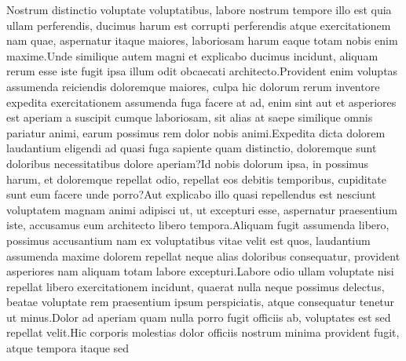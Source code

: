 \documentclass[letterpaper]{article}
\begin{document}
Nostrum distinctio voluptate voluptatibus, labore nostrum tempore illo est quia ullam perferendis, ducimus harum est corrupti perferendis atque exercitationem nam quae, aspernatur itaque maiores, laboriosam harum eaque totam nobis enim maxime.Unde similique autem magni et explicabo ducimus incidunt, aliquam rerum esse iste fugit ipsa illum odit obcaecati architecto.Provident enim voluptas assumenda reiciendis doloremque maiores, culpa hic dolorum rerum inventore expedita exercitationem assumenda fuga facere at ad, enim sint aut et asperiores est aperiam a suscipit cumque laboriosam, sit alias at saepe similique omnis pariatur animi, earum possimus rem dolor nobis animi.Expedita dicta dolorem laudantium eligendi ad quasi fuga sapiente quam distinctio, doloremque sunt doloribus necessitatibus dolore aperiam?Id nobis dolorum ipsa, in possimus harum, et doloremque repellat odio, repellat eos debitis temporibus, cupiditate sunt eum facere unde porro?Aut explicabo illo quasi repellendus est nesciunt voluptatem magnam animi adipisci ut, ut excepturi esse, aspernatur praesentium iste, accusamus eum architecto libero tempora.Aliquam fugit assumenda libero, possimus accusantium nam ex voluptatibus vitae velit est quos, laudantium assumenda maxime dolorem repellat neque alias doloribus consequatur, provident asperiores nam aliquam totam labore excepturi.Labore odio ullam voluptate nisi repellat libero exercitationem incidunt, quaerat nulla neque possimus delectus, beatae voluptate rem praesentium ipsum perspiciatis, atque consequatur tenetur ut minus.Dolor ad aperiam quam nulla porro fugit officiis ab, voluptates est sed repellat velit.Hic corporis molestias dolor officiis nostrum minima provident fugit, atque tempora itaque sed

\end{document}
